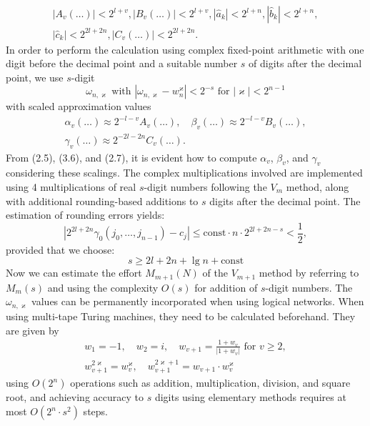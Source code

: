 \documentclass{article}
\begin{document}
\[
\begin{gathered}
|A_v(\ldots)| < 2^{l + v}, |B_v(\ldots)| < 2^{l + v}, |\hat{a}_k| < 2^{l + n}, |\hat{b}_k| < 2^{l + n}, \\
|\hat{c}_k| < 2^{2l + 2n}, |C_v(\ldots)| < 2^{2l + 2n}.
\end{gathered}
\]
In order to perform the calculation using complex fixed-point arithmetic with one digit before the decimal point and a suitable number $s$ of digits after the decimal point, we use $s$-digit
\[
\omega_{n, \varkappa}\text{ with }|\omega_{n, \varkappa} - w_n^\varkappa| < 2^{-s}\text{ for }|\varkappa| < 2^{n - 1}
\]
with scaled approximation values
\[
\begin{gathered}
\alpha_v (\ldots) \approx 2^{-l - v} A_v(\ldots), \quad \beta_v(\ldots) \approx 2^{-l - v} B_v(\ldots), \\
\gamma_v(\ldots) \approx 2^{-2l - 2n} C_v (\ldots).
\end{gathered}
\]
From (2.5), (3.6), and (2.7), it is evident how to compute $\alpha_v$, $\beta_v$, and $\gamma_v$ considering these scalings. The complex multiplications involved are implemented using 4 multiplications of real $s$-digit numbers following the $V_m$ method, along with additional rounding-based additions to $s$ digits after the decimal point. The estimation of rounding errors yields:
\[
\left|2^{2l + 2n} \gamma_0 (j_0, \ldots, j_{n - 1}) - c_j\right| \le \text{const} \cdot n \cdot 2^{2l + 2n - s} < \frac{1}{2},
\]
provided that we choose:
\[
\tag{3.9}
s \ge 2l + 2n + \lg n + \text{const}
\]
Now we can estimate the effort $M_{m + 1}(N)$ of the $V_{m+1}$ method by referring to $M_m(s)$ and using the complexity $O(s)$ for addition of $s$-digit numbers. The $\omega_{n, \varkappa}$ values can be permanently incorporated when using logical networks. When using multi-tape Turing machines, they need to be calculated beforehand. They are given by
\[
\begin{gathered}
w_1 = -1, \quad w_2 = i, \quad w_{v + 1} = \frac{1 + w_v}{|1 + w_v|}\text{ for }v \ge 2,\\
w_{v + 1}^{2 \varkappa} = w_v^\varkappa, \quad w_{v + 1}^{2\varkappa + 1} = w_{v + 1} \cdot w_v^\varkappa
\end{gathered}
\]
using $O(2^n)$ operations such as addition, multiplication, division, and square root, and achieving accuracy to $s$ digits using elementary methods requires at most $O(2^n \cdot s^2)$ steps.
\end{document}
